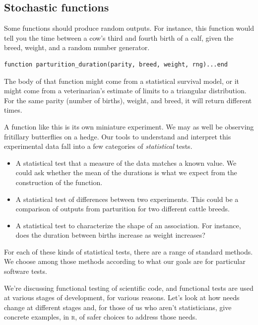\documentclass[fleqn,10pt]{olplainarticle}
\newcommand{\rlang}{\textsc{r}\xspace}
\begin{document}


\subsection{Stochastic functions}

Some functions should produce random outputs. For instance,
this function would tell you the time between a cow's
third and fourth birth of a calf, given the breed, weight,
and a random number generator.
\begin{lstlisting}
function parturition_duration(parity, breed, weight, rng)...end
\end{lstlisting}
The body of that function might come from a statistical
survival model, or it might come from a veterinarian's estimate
of limits to a triangular distribution. For the same parity (number of births), weight,
and breed, it will return different times.

A function like this is its own miniature experiment. We may as well
be observing fritillary butterflies on a hedge. Our tools to
understand and interpret this experimental data fall into a
few categories of \emph{statistical} tests.
\begin{itemize}
	\item A statistical test that a measure of the data matches
	      a known value. We could ask whether the mean of the durations
	      is what we expect from the construction of the function.

	\item A statistical test of differences between two experiments.
	      This could be a comparison of outputs from parturition
	      for two different cattle breeds.

	\item A statistical test to characterize the shape of an
	      association. For instance, does the duration between
	      births increase as weight increases?
\end{itemize}
For each of these kinds of statistical tests, there are a range of
standard methods. We choose among those methods according to what
our goals are for particular software tests.

We're discussing functional testing of scientific code, and functional
tests are used at various stages of development, for various reasons.
Let's look at how needs change at different stages and, for those of
us who aren't statisticians, give concrete examples, in \rlang,
of safer choices to address those needs.
\end{document}
